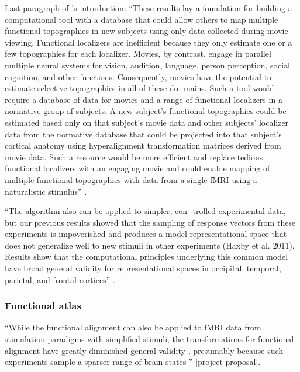 Last paragraph of \citet{jiahui2020predicting}'s introduction: ``These results
lay a foundation for building a computational tool with a database that could
allow others to map multiple functional topographies in new subjects using only
data collected during movie viewing. Functional localizers are inefficient
because they only estimate one or a few topographies for each localizer. Movies,
by contrast, engage in parallel multiple neural systems for vision, audition,
language, person perception, social cognition, and other functions.
Consequently, movies have the potential to estimate selective topographies in
all of these do- mains. Such a tool would require a database of data for movies
and a range of functional localizers in a normative group of subjects. A new
subject’s functional topographies could be estimated based only on that
subject’s movie data and other subjects’ localizer data from the normative
database that could be projected into that subject’s cortical anatomy using
hyperalignment transformation matrices derived from movie data. Such a resource
would be more efficient and replace tedious functional localizers with an
engaging movie and could enable mapping of multiple functional topographies with
data from a single fMRI using a naturalistic stimulus''
\citet{jiahui2020predicting}.

``The algorithm also can be applied to simpler, con- trolled experimental data,
but our previous results showed that the sampling of response vectors from these
experiments is impoverished and produces a model representational space that
does not generalize well to new stimuli in other experiments (Haxby et al.
2011). Results show that the computational principles underlying this common
model have broad general validity for representational spaces in occipital,
temporal, parietal, and frontal cortices'' \citep{guntupalli2016model}.



\subsubsection{Functional atlas}



%
``While the functional alignment can also be applied to fMRI data from
stimulation paradigms with simplified stimuli, the transformations for
functional alignment have greatly diminished general validity
\citep{haxby2011common}, presumably because such experiments sample a sparser
range of brain states \citep{guntupalli2016model}'' [project proposal].

